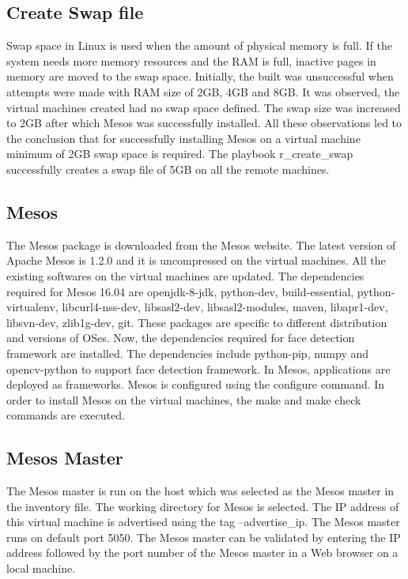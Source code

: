 \documentclass[9pt,twocolumn,twoside]{../../styles/osajnl}
\begin{document}
\subsection{Create Swap file}
Swap space in Linux is used when the amount of physical memory is
full. If the system needs more memory resources and the RAM is full,
inactive pages in memory are moved to the swap space. Initially, the
built was unsuccessful when attempts were made with RAM size of 2GB,
4GB and 8GB. It was observed, the virtual machines created had no swap
space defined. The swap size was increased to 2GB after which Mesos
was successfully installed. All these observations led to the
conclusion that for successfully installing Mesos on a virtual machine
minimum of 2GB swap space is required. The playbook r\_create\_swap
successfully creates a swap file of 5GB on all the remote machines.

\subsection{Mesos}
The Mesos package is downloaded from the Mesos website. The latest
version of Apache Mesos is 1.2.0 and it is uncompressed on the virtual
machines. All the existing softwares on the virtual machines are
updated.  The dependencies required for Mesos 16.04 are openjdk-8-jdk,
python-dev, build-essential, python-virtualenv, libcurl4-nss-dev,
libsasl2-dev, libsasl2-modules, maven, libapr1-dev, libsvn-dev,
zlib1g-dev, git. These packages are specific to different distribution
and versions of OSes. Now, the dependencies required for face
detection framework are installed.  The dependencies include
python-pip, numpy and opencv-python to support face detection
framework. In Mesos, applications are deployed as frameworks. Mesos is
configured using the configure command. In order to install Mesos on
the virtual machines, the make and make check commands are executed.

\subsection{Mesos Master}
The Mesos master is run on the host which was selected as the Mesos
master in the inventory file. The working directory for Mesos is
selected. The IP address of this virtual machine is advertised using
the tag --advertise\_ip. The Mesos master runs on default port
5050. The Mesos master can be validated by entering the IP address
followed by the port number of the Mesos master in a Web browser on a
local machine.
\end{document}
